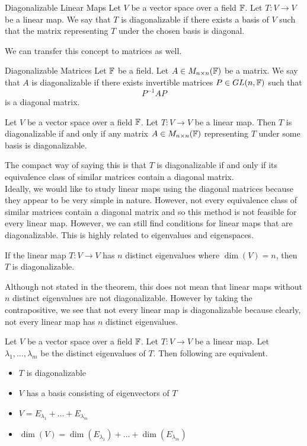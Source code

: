 \documentclass[a4paper]{article}
\begin{document}
\begin{defn}{Diagonalizable Linear Maps}{} Let $V$ be a vector space over a field $\mathbb{F}$. Let $T:V\to V$ be a linear map. We say that $T$ is diagonalizable if there exists a basis of $V$ such that the matrix representing $T$ under the chosen basis is diagonal. 
\end{defn}

We can transfer this concept to matrices as well. 

\begin{defn}{Diagonalizable Matrices}{} Let $\mathbb{F}$ be a field. Let $A\in M_{n\times n}(\mathbb{F})$ be a matrix. We say that $A$ is diagonalizable if there exists invertible matrices $P\in GL(n,\mathbb{F})$ such that $$P^{-1}AP$$ is a diagonal matrix. 
\end{defn}

\begin{lmm}{}{} Let $V$ be a vector space over a field $\mathbb{F}$. Let $T:V\to V$ be a linear map. Then $T$ is diagonalizable if and only if any matrix $A\in M_{n\times n}(\mathbb{F})$ representing $T$ under some basis is diagonalizable. 
\end{lmm}

The compact way of saying this is that $T$ is diagonalizable if and only if its equivalence class of similar matrices contain a diagonal matrix. \\

Ideally, we would like to study linear maps using the diagonal matrices because they appear to be very simple in nature. However, not every equivalence class of similar matrices contain a diagonal matrix and so this method is not feasible for every linear map. However, we can still find conditions for linear maps that are diagonalizable. This is highly related to eigenvalues and eigenspaces. 

\begin{thm}{}{} If the linear map $T:V\to V$ has $n$ distinct eigenvalues where $\dim(V)=n$, then $T$ is diagonalizable. 
\end{thm}

Although not stated in the theorem, this does not mean that linear maps without $n$ distinct eigenvalues are not diagonalizable. However by taking the contrapositive, we see that not every linear map is diagonalizable because clearly, not every linear map has $n$ distinct eigenvalues. 

\begin{thm}{}{} Let $V$ be a vector space over a field $\mathbb{F}$. Let $T:V\to V$ be a linear map. Let $\lambda_1,\dots,\lambda_m$ be the distinct eigenvalues of $T$. Then following are equivalent. 
\begin{itemize}
\item $T$ is diagonalizable
\item $V$ has a basis consisting of eigenvectors of $T$
\item $V=E_{\lambda_1}+\dots+E_{\lambda_m}$
\item $\dim(V)=\dim(E_{\lambda_1})+\dots+\dim(E_{\lambda_m})$
\end{itemize}
\end{thm}
\end{document}
